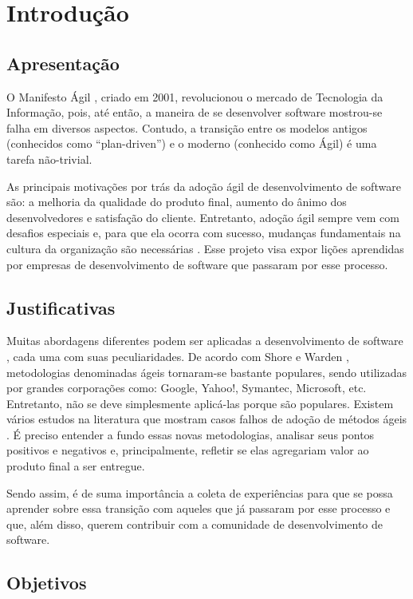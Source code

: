 \chapter{Introdução}

\section{Apresentação}

O Manifesto Ágil \cite{agileManifesto}, criado em 2001, revolucionou o mercado de Tecnologia da Informação, pois, até então, a maneira de se desenvolver software mostrou-se falha em diversos aspectos. Contudo, a transição entre os modelos antigos (conhecidos como “plan-driven”) e o moderno (conhecido como Ágil) é uma tarefa não-trivial.

As principais motivações por trás da adoção ágil de desenvolvimento de software são: a melhoria da qualidade do produto final, aumento do ânimo dos desenvolvedores e satisfação do cliente. Entretanto, adoção ágil sempre vem com desafios especiais e, para que ela ocorra com sucesso, mudanças fundamentais na cultura da organização são necessárias \cite{Hajjdiab2011}. Esse projeto visa expor lições aprendidas por empresas de desenvolvimento de software que passaram por esse processo.

\section{Justificativas}

Muitas abordagens diferentes podem ser aplicadas a desenvolvimento de software \cite{Kettunen2010}, cada uma com suas peculiaridades. De acordo com Shore e Warden \cite{Shore2007}, metodologias denominadas ágeis tornaram-se bastante populares, sendo utilizadas por grandes corporações como: Google, Yahoo!, Symantec, Microsoft, etc. Entretanto, não se deve simplesmente aplicá-las porque são populares. Existem vários estudos na literatura que mostram casos falhos de adoção de métodos ágeis \cite{Krasteva2008}. É preciso entender a fundo essas novas metodologias, analisar seus pontos positivos e negativos e, principalmente, refletir se elas agregariam valor ao produto final a ser entregue.

Sendo assim, é de suma importância a coleta de experiências para que se possa aprender sobre essa transição com aqueles que já passaram por esse processo e que, além disso, querem contribuir com a comunidade de desenvolvimento de software.

\section{Objetivos} 

